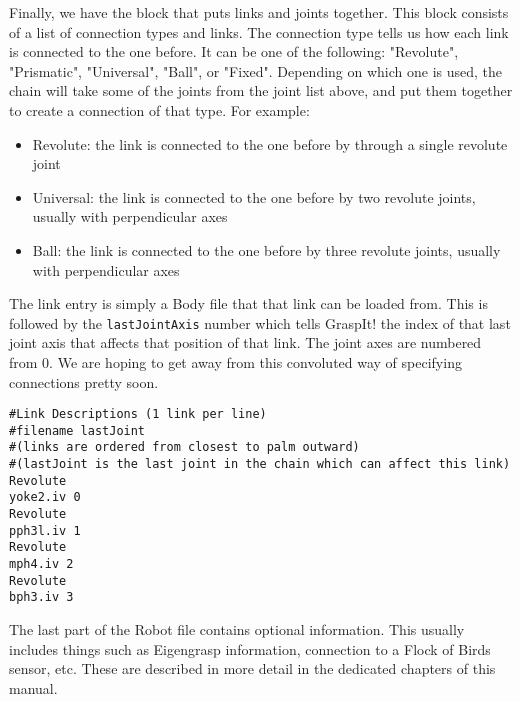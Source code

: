 Finally, we have the block that puts links and joints together. This
block consists of a list of connection types and links. The connection
type tells us how each link is connected to the one before. It can be
one of the following: "Revolute", "Prismatic", "Universal", "Ball", or
"Fixed". Depending on which one is used, the chain will take some of
the joints from the joint list above, and put them together to create
a connection of that type. For example:
\begin{itemize}
\item Revolute: the link is connected to the one before by through a
  single revolute joint 
\item Universal: the link is connected to the one before by two
  revolute joints, usually with perpendicular axes
\item Ball: the link is connected to the one before by three revolute
  joints, usually with perpendicular axes
\end{itemize}

The link entry is simply a Body file that that link can be loaded
from. This is followed by the \texttt{lastJointAxis} number which
tells GraspIt! the index of that last joint axis that affects that
position of that link. The joint axes are numbered from 0. We are
hoping to get away from this convoluted way of specifying connections
pretty soon.

\begin{verbatim}
#Link Descriptions (1 link per line)
#filename lastJoint
#(links are ordered from closest to palm outward)
#(lastJoint is the last joint in the chain which can affect this link)
Revolute
yoke2.iv 0
Revolute
pph3l.iv 1
Revolute
mph4.iv 2
Revolute
bph3.iv 3
\end{verbatim}

The last part of the Robot file contains optional information. This
 usually includes things such as Eigengrasp information, connection to
 a Flock of Birds sensor, etc. These are described in more detail in
 the dedicated chapters of this manual.
